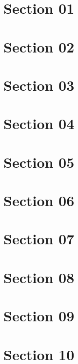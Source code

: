 \section{Section 01}
\lipsum[1]

\section{Section 02}
\lipsum[1]

\section{Section 03}
\lipsum[1]

\section{Section 04}
\lipsum[1]

\section{Section 05}
\lipsum[1]

\section{Section 06}
\lipsum[1]

\section{Section 07}
\lipsum[1]

\section{Section 08}
\lipsum[1]

\section{Section 09}
\lipsum[1]

\section{Section 10}
\lipsum[1]
